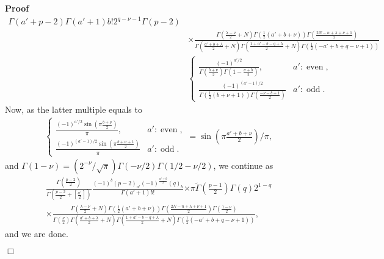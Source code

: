 \documentclass{article}
\newcommand{\tmop}[1]{\ensuremath{\operatorname{#1}}}
\renewenvironment{proof}{\noindent\textbf{Proof\ }}{\hspace*{\fill}$\Box$\medskip}
\theoremstyle{remark}
\begin{document}
\begin{proof}
\begin{eqnarray}
{    \Gamma (a' + p - 2)}{\Gamma (a' + 1) b! 2^{q - \nu - 1} \Gamma (p - 2)} & 
    \nonumber\\
    & \times \frac{\Gamma \left( \frac{\lambda - \nu}{2} + N \right) \Gamma
    \left( \frac{1}{2} (a' + b + \nu) \right) \Gamma \left( \frac{2 N - n +
    \lambda + \nu + 1}{2} \right)}{\Gamma \left( \frac{a' + b + \lambda}{2} +
    N \right) \Gamma \left( \frac{1 + a' - b - q + \lambda}{2} + N \right)
    \Gamma \left( \frac{1}{2} (- a' + b + q - \nu + 1) \right)} &  \nonumber\\
    & \left\{ \begin{array}{ll}
      \frac{(- 1)^{a' / 2}}{\Gamma \left( \frac{b + \nu}{2} \right) \Gamma
      \left( 1 - \frac{\nu + b}{2} \right) }, & a' : \tmop{even},\\
      \frac{(- 1)^{(a' - 1) / 2}}{\Gamma \left( \frac{1}{2} (b + \nu + 1)
      \right) \Gamma \left( \frac{- \nu - b + 1}{2} \right) } & a' :
      \tmop{odd} .
    \end{array} \right. &  \nonumber
  \end{eqnarray}
  Now, as the latter multiple equals to
  \begin{eqnarray}
    & \left\{ \begin{array}{ll}
      \frac{(- 1)^{a' / 2} \sin \left( \pi \frac{b + \nu}{2} \right)}{\pi}, &
      a' : \tmop{even},\\
      \frac{(- 1)^{(a' - 1) / 2} \sin \left( \pi \frac{b + \nu + 1}{2}
      \right)}{\pi} & a' : \tmop{odd} .
    \end{array} \right. = \sin \left( \pi \frac{a' + b + \nu}{2} \right) /
    \pi, &  \nonumber
  \end{eqnarray}
  and $\Gamma (1 - \nu) = \left( 2^{- \nu} / \sqrt{\pi} \right) \Gamma (- \nu
  / 2) \Gamma (1 / 2 - \nu / 2)$, we continue as
  \begin{eqnarray}
    & \frac{\Gamma \left( \frac{p - 2}{2} \right)}{\Gamma \left( \frac{p -
    2}{2} + \left[ \frac{a'}{2} \right] \right)} \frac{(- 1)^b (p - 2)_{a'} (-
    1)^{\frac{a' + b}{2}} (q)_b}{\Gamma (a' + 1) b!} \left. \times \pi
    \tilde{\Gamma} \left( \frac{p - 1}{2} \right) \Gamma (q) 2^{1 - q} \right.
    &  \nonumber\\
    & \times \frac{\Gamma \left( \frac{\lambda - \nu}{2} + N \right) \Gamma
    \left( \frac{1}{2} (a' + b + \nu) \right) \Gamma \left( \frac{2 N - n +
    \lambda + \nu + 1}{2} \right) \Gamma \left( \frac{1 - \nu}{2}
    \right)}{\Gamma \left( \frac{\nu}{2} \right) \Gamma \left( \frac{a' + b +
    \lambda}{2} + N \right) \Gamma \left( \frac{1 + a' - b - q + \lambda}{2} +
    N \right) \Gamma \left( \frac{1}{2} (- a' + b + q - \nu + 1) \right)}, & 
    \nonumber
  \end{eqnarray}
  and we are done.
  

\end{proof}
\end{document}
